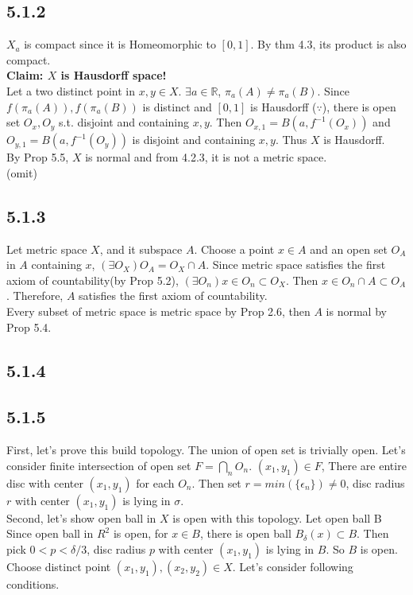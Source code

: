 \documentclass{article}
\begin{document}
\subsection*{5.1.2}

$X_a$ is compact since it is Homeomorphic to $[0,1]$. By thm 4.3, its product is also compact.\\
\textbf{Claim: $X$ is Hausdorff space!}\\
Let a two distinct point in $x, y \in X$. $\exists a \in \mathbb{R}$, $\pi_a(A) \neq \pi_a(B)$. Since $f(\pi_a(A)), f(\pi_a(B))$ is distinct and $[0,1]$ is Hausdorff ($\because$), there is open set $O_x, O_y$ s.t. disjoint and containing $x, y$. Then $O_{x,1}=B(a, f^{-1}(O_x))$ and $O_{y,1}=B(a, f^{-1}(O_y))$ is disjoint and containing $x, y$. Thus $X$ is Hausdorff.\\
By Prop 5.5, $X$ is normal and from 4.2.3, it is not a metric space.\\
(omit)

\subsection*{5.1.3}

Let metric space $X$, and it subspace $A$. Choose a point $x\in A$ and an open set $O_A$ in $A$ containing $x$, $(\exists O_X)O_A=O_X \cap A$. Since metric space satisfies the first axiom of countability(by Prop 5.2), $(\exists O_n)x \in O_n \subset O_X$. Then $x \in O_n \cap A \subset O_A$. Therefore, $A$ satisfies the first axiom of countability.\\
Every subset of metric space is metric space by Prop 2.6, then $A$ is normal by Prop 5.4.

\subsection*{5.1.4}

\subsection*{5.1.5}

First, let's prove this build topology. The union of open set is trivially open. Let's consider finite intersection of open set $F=\bigcap_n O_n$. $(x_1,y_1)\in F$, There are entire disc with center $(x_1,y_1)$ for each $O_n$. Then set $r=min(\{\epsilon_n\})\neq0$, disc radius $r$ with center $(x_1,y_1)$ is lying in $\sigma$.\\
Second, let's show open ball in $X$ is open with this topology. Let open ball B Since open ball in $R^2$ is open, for $x \in B$, there is open ball $B_\delta(x)\subset B$. Then pick $0<p<\delta/3$, disc radius $p$ with center $(x_1, y_1)$ is lying in $B$. So $B$ is open.\\
Choose distinct point $(x_1, y_1), (x_2, y_2) \in X$. Let's consider following conditions.
\end{document}
